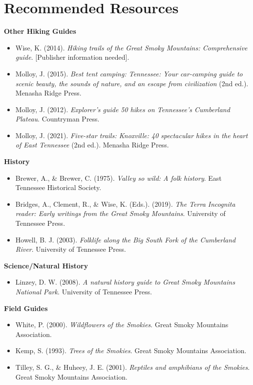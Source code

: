 \documentclass[
  letterpaper,
  DIV=11,
  numbers=noendperiod]{scrreprt}
\providecommand{\tightlist}{%
  \setlength{\itemsep}{0pt}\setlength{\parskip}{0pt}}\usepackage{longtable,booktabs,array}
\begin{document}
\chapter{Recommended Resources}\label{recommended-resources}

\textbf{Other Hiking Guides}

\begin{itemize}
\item
  Wise, K. (2014). \emph{Hiking trails of the Great Smoky Mountains:
  Comprehensive guide}. {[}Publisher information needed{]}.
\item
  Molloy, J. (2015). \emph{Best tent camping: Tennessee: Your
  car-camping guide to scenic beauty, the sounds of nature, and an
  escape from civilization} (2nd ed.). Menasha Ridge Press.
\item
  Molloy, J. (2012). \emph{Explorer's guide 50 hikes on Tennessee's
  Cumberland Plateau}. Countryman Press.
\item
  Molloy, J. (2021). \emph{Five-star trails: Knoxville: 40 spectacular
  hikes in the heart of East Tennessee} (2nd ed.). Menasha Ridge Press.
\end{itemize}

\textbf{History}

\begin{itemize}
\item
  Brewer, A., \& Brewer, C. (1975). \emph{Valley so wild: A folk
  history}. East Tennessee Historical Society.
\item
  Bridges, A., Clement, R., \& Wise, K. (Eds.). (2019). \emph{The Terra
  Incognita reader: Early writings from the Great Smoky Mountains}.
  University of Tennessee Press.
\item
  Howell, B. J. (2003). \emph{Folklife along the Big South Fork of the
  Cumberland River}. University of Tennessee Press.
\end{itemize}

\textbf{Science/Natural History}

\begin{itemize}
\tightlist
\item
  Linzey, D. W. (2008). \emph{A natural history guide to Great Smoky
  Mountains National Park}. University of Tennessee Press.
\end{itemize}

\textbf{Field Guides}

\begin{itemize}
\item
  White, P. (2000). \emph{Wildflowers of the Smokies}. Great Smoky
  Mountains Association.
\item
  Kemp, S. (1993). \emph{Trees of the Smokies}. Great Smoky Mountains
  Association.
\item
  Tilley, S. G., \& Huheey, J. E. (2001). \emph{Reptiles and amphibians
  of the Smokies}. Great Smoky Mountains Association.
\end{itemize}
\end{document}
